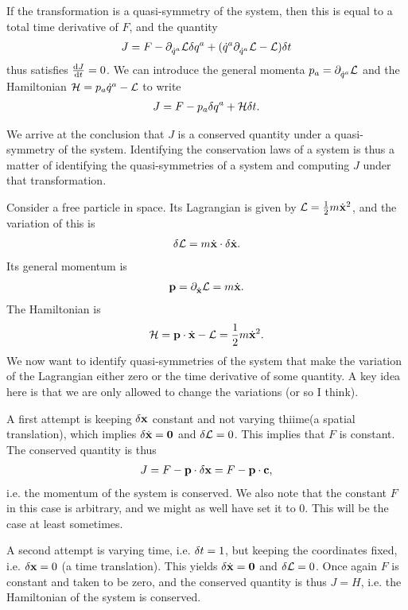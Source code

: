 If the transformation is a quasi-symmetry of the system, then this is equal to a total time derivative of $F$, and the quantity
\begin{align*}
	J = F - \partial^{}_{\dot{q}^{a}}\mathcal{L}\delta q^{a} + (\dot{q}^{a}\partial^{}_{\dot{q}^{a}}\mathcal{L} - \mathcal{L})\delta t
\end{align*}
thus satisfies $\dv{J}{t} = 0$. We can introduce the general momenta $p_{a} = \partial^{}_{\dot{q}^{a}}\mathcal{L}$ and the Hamiltonian $\mathcal{H} = p_{a}\dot{q}^{a} - \mathcal{L}$ to write
\begin{align*}
	J = F - p_{a}\delta q^{a} + \mathcal{H}\delta t.
\end{align*}

We arrive at the conclusion that $J$ is a conserved quantity under a quasi-symmetry of the system. Identifying the conservation laws of a system is thus a matter of identifying the quasi-symmetries of a system and computing $J$ under that transformation.

Consider a free particle in space. Its Lagrangian is given by $\mathcal{L} = \frac{1}{2}m\dot{\vb{x}}^{2}$, and the variation of this is
\begin{align*}
	\delta \mathcal{L} = m\dot{\vb{x}}\cdot\delta \dot{\vb{x}}.
\end{align*}
Its general momentum is
\begin{align*}
	\vb{p} = \partial^{}_{\dot{\vb{x}}}\mathcal{L} = m\dot{\vb{x}}.
\end{align*}
The Hamiltonian is
\begin{align*}
	\mathcal{H} = \vb{p}\cdot\dot{\vb{x}} - \mathcal{L} = \frac{1}{2}m\dot{\vb{x}}^{2}.
\end{align*}
We now want to identify quasi-symmetries of the system that make the variation of the Lagrangian either zero or the time derivative of some quantity. A key idea here is that we are only allowed to change the variations (or so I think).

A first attempt is keeping $\delta \vb{x}$ constant and not varying thiime(a spatial translation), which implies $\delta \dot{\vb{x}} = \vb{0}$ and $\delta \mathcal{L} = 0$. This implies that $F$ is constant. The conserved quantity is thus
\begin{align*}
	J = F - \vb{p}\cdot\delta \vb{x} = F - \vb{p}\cdot\vb{c},
\end{align*}
i.e. the momentum of the system is conserved. We also note that the constant $F$ in this case is arbitrary, and we might as well have set it to $0$. This will be the case at least sometimes.

A second attempt is varying time, i.e. $\delta t = 1$, but keeping the coordinates fixed, i.e. $\delta \vb{x} = 0$ (a time translation). This yields $\delta \dot{\vb{x}} = \vb{0}$ and $\delta \mathcal{L} = 0$. Once again $F$ is constant and taken to be zero, and the conserved quantity is thus $J = H$, i.e. the Hamiltonian of the system is conserved.


